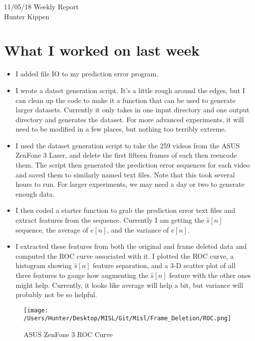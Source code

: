 \documentclass[12pt]{article}%
\def\bi{\begin{itemize}     %
\vspace{-0.5em}\setlength\itemsep{0em}}
\begin{document}
\begin{center}
{\LARGE 11/05/18 Weekly Report}\\
\vspace{0.5em}
{\Large Hunter Kippen}
\vspace{0.5em}
\end{center}


\section{What I worked on last week}
\bi
\item I added file IO to my prediction error program.
\item I wrote a datset generation script. It's a little rough around the edges, but I can clean up the code to make it a function that can be used to generate larger datasets. Currently it only takes in one input directory and one output directory and generates the dataset. For more advanced experiments, it will need to be modified in a few places, but nothing too terribly extreme.
\item I used the dataset generation script to take the 259 videos from the ASUS ZenFone 3 Laser, and delete the first fifteen frames of each then reencode them. The script then generated the prediction error sequences for each video and saved them to similarly named text files. Note that this took several hours to run. For larger experiments, we may need a day or two to generate enough data.
\item I then coded a starter function to grab the prediction error text files and extract features from the sequence. Currently I am getting the $\hat{s}[n]$ sequence, the average of $e[n]$, and the variance of $e[n]$.
\item I extracted these features from both the original and frame deleted data and computed the ROC curve associated with it. I plotted the ROC curve, a histogram showing $\hat{s}[n]$ feature separation, and a 3-D scatter plot of all three features to gauge how augmenting the $\hat{s}[n]$ feature with the other ones might help. Currently, it looks like average will help a bit, but variance will probably not be so helpful.
\end{itemize}

\begin{figure}[ht!]
  \centering
  \texttt{[image: /Users/Hunter/Desktop/MISL/Git/Misl/Frame\_Deletion/ROC.png]}
  \caption{ASUS ZenFone 3 ROC Curve}
  \label{fig:ROC}
\end{figure}
\end{document}
